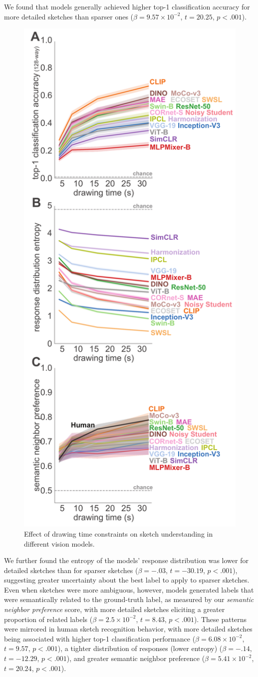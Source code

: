 \documentclass{article}
\begin{document}
We found that models generally achieved higher top-1 classification accuracy for more detailed sketches than sparser ones ($\beta=9.57\times10^{-2}$, $t=20.25$, $p<.001$).
\begin{figure}    
    \centering
    \includegraphics[width=.35\textwidth]{neurips_figures/neuripds_entropy_accuracy_dd_snp_v3_vertical.pdf}
    \caption{Effect of drawing time constraints on sketch understanding in different vision models. }
    \label{fig:accuracy_entropy_snp}
    \vspace{-1em}
\end{figure}


We further found the entropy of the models' response distribution was lower for detailed sketches than for sparser sketches ($\beta = -.03$, $t = -30.19$, $p<.001$), suggesting greater uncertainty about the best label to apply to sparser sketches. 
Even when sketches were more ambiguous, however, models generated labels that were semantically related to the ground-truth label, as measured by our \textit{semantic neighbor preference} score, with more detailed sketches eliciting a greater proportion of related labels ($\beta = 2.5 \times10^{-2}$, $t=8.43$, $p <.001$).
These patterns were mirrored in human sketch recognition behavior, with more detailed sketches being associated with higher top-1 classification performance ($\beta = 6.08\times10^{-2}$, $t=9.57$, $p<.001$), a tighter distribution of responses (lower entropy) ($\beta=-.14$, $t=-12.29$, $p<.001$), and greater semantic neighbor preference ($\beta=5.41\times10^{-2}$, $t=20.24$, $p<.001$).
\end{document}
